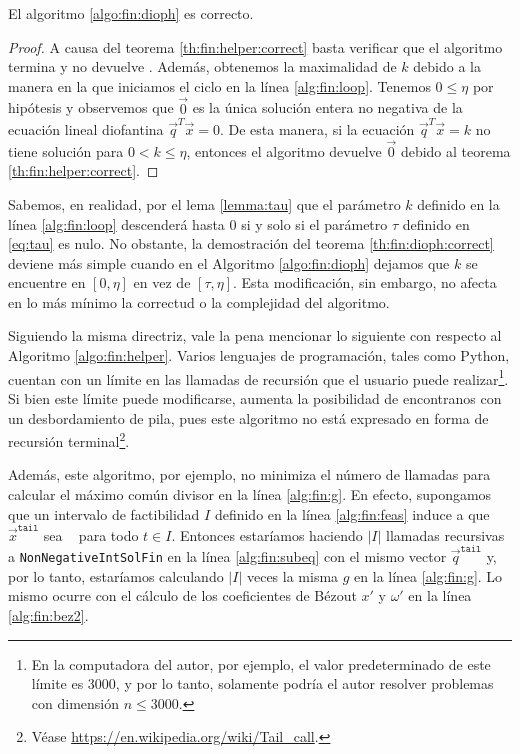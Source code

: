 \begin{theorem}
	\label{th:fin:dioph:correct}
	El algoritmo \ref{algo:fin:dioph} es correcto.
\end{theorem}
\begin{proof}
	A causa del teorema \ref{th:fin:helper:correct} basta verificar que el algoritmo termina y no
	devuelve \NIL. Además, obtenemos la maximalidad de $k$ debido a la manera en la que iniciamos el
	ciclo en la línea \ref{alg:fin:loop}. Tenemos $0 \leq \eta$ por hipótesis y observemos que
	$\vec{0}$ es la única solución entera no negativa de la ecuación lineal diofantina
	$\vec{q}^T\vec{x} = 0$. De esta manera, si la ecuación $\vec{q}^T\vec{x} = k$ no tiene solución
	para $0 < k \leq \eta$, entonces el algoritmo devuelve $\vec{0}$ debido al teorema
	\ref{th:fin:helper:correct}.
\end{proof}

Sabemos, en realidad, por el lema \ref{lemma:tau} que el parámetro $k$ definido en la línea
\ref{alg:fin:loop} descenderá hasta 0 si y solo si el parámetro $\tau$ definido en \eqref{eq:tau}
es nulo. No obstante, la demostración del teorema \ref{th:fin:dioph:correct} deviene más simple
cuando en el Algoritmo \ref{algo:fin:dioph} dejamos que $k$ se encuentre en $[0, \eta]$ en vez de
$[\tau, \eta]$. Esta modificación, sin embargo, no afecta en lo más mínimo la correctud o la
complejidad del algoritmo.

Siguiendo la misma directriz, vale la pena mencionar lo siguiente con respecto al Algoritmo
\ref{algo:fin:helper}. Varios lenguajes de programación, tales como Python, cuentan con un límite en
las llamadas de recursión que el usuario puede realizar\footnote{
	En la computadora del autor, por ejemplo, el valor predeterminado de este límite es 3000, y por
	lo tanto, solamente podría el autor resolver problemas con dimensión $n \leq 3000$.
}. Si bien este límite puede modificarse, aumenta la posibilidad de encontranos con un
desbordamiento de pila, pues este algoritmo no está expresado en forma de recursión
terminal\footnote{
	Véase \url{https://en.wikipedia.org/wiki/Tail_call}.
}.

Además, este algoritmo, por ejemplo, no minimiza el número de llamadas para calcular el máximo común
divisor en la línea \ref{alg:fin:g}. En efecto, supongamos que un intervalo de factibilidad $I$
definido en la línea \ref{alg:fin:feas} induce a que $\vec{x}^{\texttt{tail}}$ sea \NIL~ para todo
$t \in I$. Entonces estaríamos haciendo $|I|$ llamadas recursivas a \texttt{NonNegativeIntSolFin} en
la línea \ref{alg:fin:subeq} con el mismo vector $\vec{q}^{\texttt{tail}}$ y, por lo tanto,
estaríamos calculando $|I|$ veces la misma $g$ en la línea \ref{alg:fin:g}. Lo mismo ocurre con el
cálculo de los coeficientes de Bézout $x'$ y $\omega'$ en la línea \ref{alg:fin:bez2}.

